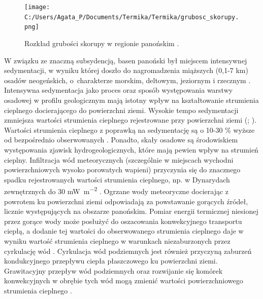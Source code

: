 \documentclass[11.5pt,twoside]{report}
\begin{document}
\begin{figure}[h]
	\centering
	\texttt{[image: C:/Users/Agata\_P/Documents/Termika/Termika/grubosc\_skorupy.png]}
	\caption{Rozkład grubości skorupy w regionie panońskim \parencite{Horvath.2015}.}
	\label{horvath}
\end{figure}

 W związku ze znaczną subsydencją, basen panoński był miejscem intensywnej sedymentacji, w wyniku której doszło do nagromadzenia miąższych (0,1-7 km) osadów neogeńskich, o~charakterze morskim, deltowym, jeziornym i rzecznym \parencite{Toth.2001}. Intensywna sedymentacja jako proces oraz sposób występowania warstwy osadowej w profilu geologicznym mają istotny wpływ na kształtowanie strumienia cieplnego docierającego do powierzchni ziemi. Wysokie tempo sedymentacji zmniejsza wartości strumienia cieplnego rejestrowane przy powierzchni ziemi (\cite{Lenkey.2017}; \cite{Horvath.2015}). Wartości strumienia cieplnego z poprawką na sedymentację są o 10-30 \% wyższe od bezpośrednio obserwowanych \parencite{Lenkey.2002}. Ponadto, skały osadowe są środowiskiem występowania zjawisk hydrogeologicznych, które mają pewien wpływ na strumień cieplny. Infiltracja wód meteorycznych (szczególnie w miejscach wychodni powierzchniowych wysoko porowatych wapieni) przyczynia się do znacznego spadku rejestrowanych wartości strumienia cieplnego, np. w Dynarydach zewnętrznych do 30 \si{\milli\watt\per\meter\squared} \parencite{Horvath.2015}. Ogrzane wody meteoryczne docierając z powrotem ku powierzchni ziemi odpowiadają za powstawanie gorących \'{z}ródeł, licznie występujących na obszarze panońskim. Pomiar energii termicznej niesionej przez gorące wody może posłużyć do oszacowania konwekcyjnego transportu ciepłą, a dodanie tej wartości do obserwowanego strumienia cieplnego daje w wyniku wartość strumienia cieplnego w warunkach niezaburzonych przez cyrkulację wód \parencite{Lenkey.2017}. Cyrkulacja wód podziemnych jest również przyczyną zaburzeń kondukcyjnego przepływu ciepła płaszczowego ku powierzchni ziemi. Grawitacyjny przepływ wód podziemnych oraz rozwijanie się komórek konwekcyjnych w obrębie tych wód mogą zmienić wartości powierzchniowego strumienia cieplnego \parencite{Horvath.2015}. 
 
\end{document}
